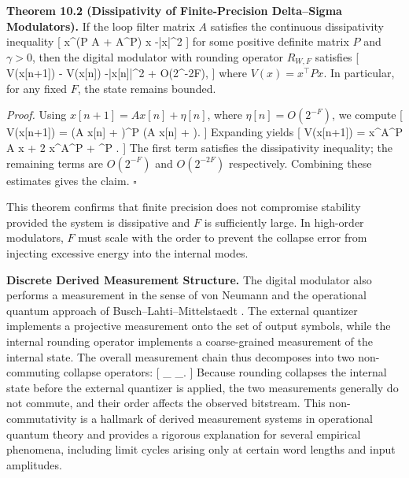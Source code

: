 \medskip

\textbf{Theorem 10.2 (Dissipativity of Finite-Precision Delta–Sigma Modulators).}
If the loop filter matrix $A$ satisfies the continuous dissipativity inequality
[
x^\top (P A + A^\top P) x \le -\gamma |x|^{2}
]
for some positive definite matrix $P$ and $\gamma>0$, then the digital modulator with rounding operator $R_{W,F}$ satisfies
[
V(x[n+1]) - V(x[n]) \le -\gamma |x[n]|^{2} + O(2^{-2F}),
]
where $V(x) = x^\top P x$. In particular, for any fixed $F$, the state remains bounded.

\textit{Proof.}
Using $x[n+1] = A x[n] + \eta[n]$, where $\eta[n] = O(2^{-F})$, we compute
[
V(x[n+1]) = (A x[n] + \eta[n])^\top P (A x[n] + \eta[n]).
]
Expanding yields
[
V(x[n+1]) = x^\top A^\top P A x + 2 x^\top A^\top P \eta + \eta^\top P \eta.
]
The first term satisfies the dissipativity inequality; the remaining terms are $O(2^{-F})$ and $O(2^{-2F})$ respectively. Combining these estimates gives the claim. \hfill $\square$

\medskip

This theorem confirms that finite precision does not compromise stability provided the system is dissipative and $F$ is sufficiently large. In high-order modulators, $F$ must scale with the order to prevent the collapse error from injecting excessive energy into the internal modes.

\medskip

\textbf{Discrete Derived Measurement Structure.}
The digital modulator also performs a measurement in the sense of von Neumann \cite{vonneumann1932foundations} and the operational quantum approach of Busch–Lahti–Mittelstaedt \cite{busch1996quantummeasurement}. The external quantizer implements a projective measurement onto the set of output symbols, while the internal rounding operator implements a coarse-grained measurement of the internal state. The overall measurement chain thus decomposes into two non-commuting collapse operators:
[
\Pi_{} \circ \Pi_{}.
]
Because rounding collapses the internal state before the external quantizer is applied, the two measurements generally do not commute, and their order affects the observed bitstream. This non-commutativity is a hallmark of derived measurement systems in operational quantum theory and provides a rigorous explanation for several empirical phenomena, including limit cycles arising only at certain word lengths and input amplitudes.

\medskip

